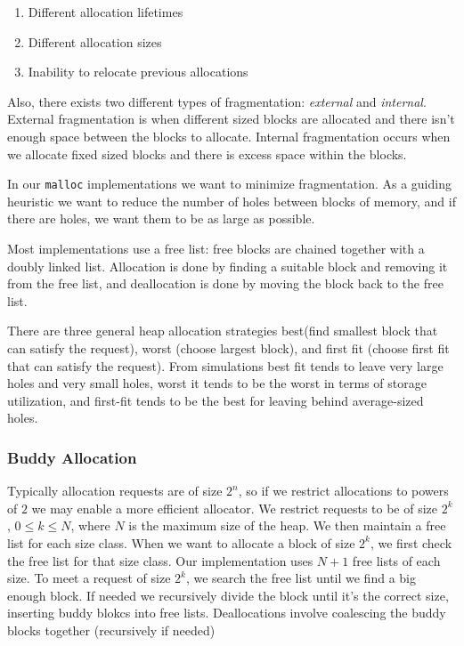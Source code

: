 \documentclass[../notes.tex]{subfiles}
\begin{document}
\begin{enumerate}
    \item Different allocation lifetimes
    \item  Different allocation sizes
    \item Inability to relocate previous allocations
\end{enumerate}


Also, there exists two different types of fragmentation: \textit{external} and \textit{internal}. External fragmentation is when different sized blocks are allocated and there isn't enough space between the blocks to allocate. Internal fragmentation occurs when we allocate fixed sized blocks and there is excess space within the blocks.

In our \texttt{malloc} implementations we want to minimize fragmentation.
As a guiding heuristic we want to reduce the number of holes between blocks of memory, and if there are holes, we want them to be as large as possible.

Most implementations use a free list: free blocks are chained together with a doubly linked list. Allocation is done by finding a suitable block and removing it from the free list, and deallocation is done by moving the block back to the free list.

There are three general heap allocation strategies best(find smallest block that can satisfy the request), worst (choose largest block), and first fit (choose first fit that can satisfy the request).
From simulations best fit tends to leave very large holes and very small holes, worst it tends to be the worst in terms of storage utilization, and first-fit tends to be the best for leaving behind average-sized holes.




\subsubsection{Buddy Allocation}

Typically allocation requests are of size $ 2^n $, so if we restrict allocations to powers of $ 2 $ we may enable a more efficient allocator.
We restrict requests to be of size $ 2^k$, $ 0 \le  k \le  N $, where $ N $ is the maximum size of the heap. We then maintain a free list for each size class.
When we want to allocate a block of size $ 2^k $, we first check the free list for that size class.
Our implementation uses $ N+1 $ free lists of each size.
To meet a request of size $ 2^k $, we search the free list until we find a big enough block. If needed we recursively divide the block until it's the correct size, inserting buddy blokcs into free lists. 
Deallocations involve coalescing the buddy blocks together (recursively if needed)
\end{document}
